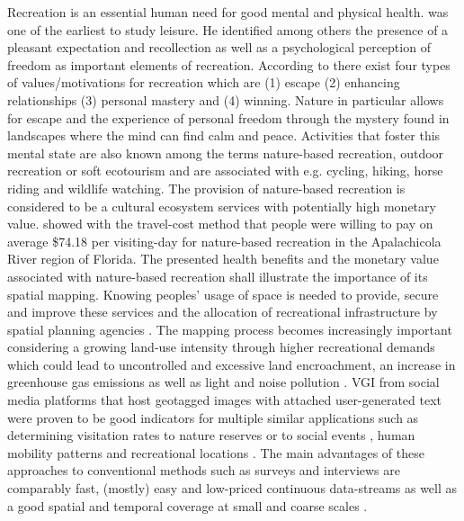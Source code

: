 Recreation is an essential human need for good mental \parencite{Trenberth2002} and physical health. \textcite{Kaplan1960} was one of the earliest to study leisure. He identified among others the presence of a pleasant expectation and recollection as well as a psychological perception of freedom as important elements of recreation. According to \textcite{Dillard2011} there exist four types of values/motivations for recreation which are (1) escape (2) enhancing relationships (3) personal mastery and (4) winning. Nature in particular allows for escape and the experience of personal freedom through the mystery found in landscapes \parencite{Kaplan1989} where the mind can find calm and peace. Activities that foster this mental state are also known among the terms nature-based recreation, outdoor recreation or soft ecotourism \parencite{Deng2002, Balmford2009} and are associated with e.g. cycling, hiking, horse riding and wildlife watching. The provision of nature-based recreation is considered to be a cultural ecosystem services \parencite{Weyland2014, Richards2018, Yoshimura2017} with potentially high monetary value. \textcite{Shrestha2007} showed with the travel-cost method that people were willing to pay on average \$74.18 per visiting-day for nature-based recreation in the Apalachicola River region of Florida. The presented health benefits and the monetary value associated with nature-based recreation shall illustrate the importance of its spatial mapping. Knowing peoples' usage of space is needed to provide, secure and improve these services and the allocation of recreational infrastructure by spatial planning agencies \parencite{Sen2014}. The mapping process becomes increasingly important considering a growing land-use intensity through higher recreational demands which could lead to uncontrolled and excessive land encroachment, an increase in greenhouse gas emissions as well as light and noise pollution \parencite{Song2018}.
VGI from social media platforms that host geotagged images with attached user-generated text were proven to be good indicators for multiple similar applications such as determining visitation rates to nature reserves \parencite{Tenkanen2017, Heikinheimo2017, Keeler2015, Wood2013, Fisher2018} or to social events \parencite{Pettersson2011}, human mobility patterns \parencite{Barchiesi2015, Grossenbacher2014} and recreational locations \parencite{Weyland2014, Hill2006, Neuvonen2010}. The main advantages of these approaches to conventional methods such as surveys and interviews are comparably fast, (mostly) easy and low-priced \parencite{Richards2018} continuous data-streams as well as a good spatial and temporal coverage at small \parencite{Buckee2015b} and coarse scales \parencite{Weyland2014}. \\

